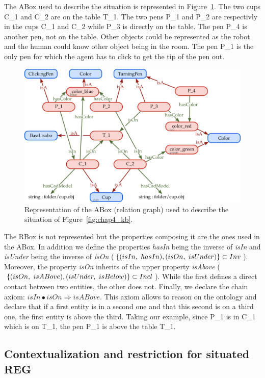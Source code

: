 The ABox used to describe the situation is represented in Figure~\ref{fig:chap4_kb_Abox}. The two cups C\_1 and C\_2 are on the table T\_1. The two pens P\_1 and P\_2 are respectivly in the cups C\_1 and C\_2 while P\_3 is directly on the table. The pen P\_4 is another pen, not on the table. Other objects could be represented as the robot and the human could know other object being in the room. The pen P\_1 is the only pen for which the agent has to click to get the tip of the pen out.

\begin{figure}[ht!]
\centering
\includegraphics[scale=0.38]{figures/chapter4/pens_Abox.png}
\caption{\label{fig:chap4_kb_Abox} Representation of the ABox (relation graph) used to describe the situation of Figure~\ref{fig:chap4_kb}. }
\end{figure}

The RBox is not represented but the properties composing it are the ones used in the ABox. In addition we define the properties \textit{hasIn} being the inverse of \textit{isIn} and \textit{isUnder} being the inverse of \textit{isOn} ($\{(isIn,\ hasIn), (isOn,\ isUnder)\} \subset \invset$). Moreover, the property \textit{isOn} inherits of the upper property \textit{isAbove} ($\{(isOn,\ isABove), (isUnder,\ isBelow)\} \subset Incl$). While the first defines a direct contact between two entities, the other does not. Finally, we declare the chain axiom: $isIn \bullet isOn \Rightarrow isABove$. This axiom allows to reason on the ontology and declare that if a first entity is in a second one and that this second is on a third one, the first entity is above the third. Taking our example, since P\_1 is in C\_1 which is on T\_1, the pen P\_1 is above the table T\_1.

\subsection{Contextualization and restriction for situated REG}

